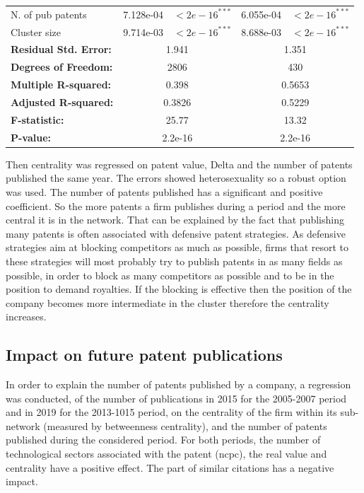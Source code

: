 \documentclass[12pt]{article}
\begin{document}
\begin{table}[h!]
\begin{tabular}{lcccc}
N. of pub patents               & 7.128e-04 & $<2e-16^{***}$ & 6.055e-04 & $<2e-16^{***}$ \\
Cluster size       & 9.714e-03 & $<2e-16^{***}$ & 8.688e-03 & $<2e-16^{***}$ \\
\midrule
\multicolumn{1}{l}{\textbf{Residual Std. Error:}} & \multicolumn{2}{c}{1.941} & \multicolumn{2}{c}{1.351} \\
\multicolumn{1}{l}{\textbf{Degrees of Freedom:}} & \multicolumn{2}{c}{2806} & \multicolumn{2}{c}{430} \\
\multicolumn{1}{l}{\textbf{Multiple R-squared:}} & \multicolumn{2}{c}{0.398} & \multicolumn{2}{c}{0.5653} \\
\multicolumn{1}{l}{\textbf{Adjusted R-squared:}} & \multicolumn{2}{c}{0.3826} & \multicolumn{2}{c}{0.5229} \\
\multicolumn{1}{l}{\textbf{F-statistic:}} & \multicolumn{2}{c}{25.77} & \multicolumn{2}{c}{13.32} \\
\multicolumn{1}{l}{\textbf{P-value:}} & \multicolumn{2}{c}{2.2e-16} & \multicolumn{2}{c}{ 2.2e-16} \\
\bottomrule
\end{tabular}
\end{table}

Then centrality was regressed on patent value, Delta and the number of patents published the same year. The errors showed heterosexuality so a robust option was used.  The number of patents published has a significant and positive coefficient. So the more patents a firm publishes during a period and the more central it is in the network. That can be explained by the fact that publishing many patents is often associated with defensive patent strategies. As defensive strategies aim at blocking competitors as much as possible, firms that resort to these strategies will most probably try to publish patents in as many fields as possible, in order to block as many competitors as possible and to be in the position to demand royalties. If the blocking is effective then the position of the company becomes more intermediate in the cluster therefore the centrality increases. 

\subsection{Impact on future patent publications}

In order to explain the number of patents published by a company, a regression was conducted, of the number of publications in 2015 for the 2005-2007 period and in 2019 for the 2013-1015 period, on the centrality of the firm within its sub-network (measured by betweenness centrality), and the number of patents published during the considered period. For both periods, the number of technological sectors associated with the patent (ncpc), the real value and centrality have a positive effect. The part of similar citations has a negative impact. 
\end{document}
